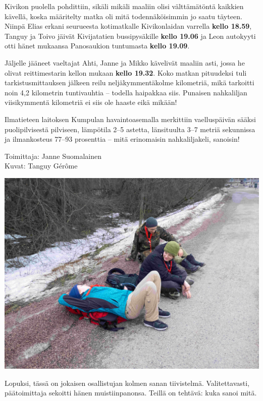 \begin{multicols}{2}
	Kivikon puolella pohdittiin, sikäli mikäli maaliin olisi välttämätöntä
	kaikkien kävellä, koska määritelty matka oli mitä todennäköisimmin jo
	saatu täyteen. Niinpä Elias erkani seurueesta kotimatkalle
	Kivikonlaidan varrella \textbf{kello 18.59}, Tanguy ja Toivo jäivät
	Kivijatatien bussipysäkille \textbf{kello 19.06} ja Leon autokyyti otti
	hänet mukaansa Panosaukion tuntumasta \textbf{kello 19.09}.

	Jäljelle jääneet vaeltajat Ahti, Janne ja Mikko kävelivät maaliin asti,
	jossa he olivat reittimestarin kellon mukaan \textbf{kello 19.32}. Koko
	matkan pituudeksi tuli tarkistusmittauksen jälkeen reilu
	neljäkymmentäkolme kilometriä, mikä tarkoitti noin 4,2 kilometrin
	tuntivauhtia – todella haipakkaa siis. Punaisen nahkaliljan
	viisikymmentä kilometriä ei siis ole haaste eikä mikään!

	Ilmatieteen laitoksen Kumpulan havaintoasemalla merkittiin
	vaelluspäivän sääksi puolipilvisestä pilviseen, lämpötila 2–5 astetta,
	länsituulta 3–7 metriä sekunnissa ja ilmankosteus 77–93 prosenttia –
	mitä erinomaisin nahkaliljakeli, sanoisin!\\

	\vspace*{0.50cm}

	\raggedleft Toimittaja: Janne Suomalainen\\
	\vspace*{0.10cm}
	\raggedleft Kuvat: Tanguy Gérôme

\end{multicols}

\begin{center}
\includegraphics[width=0.65\linewidth]{assets/nahkaliljaviikki}
\end{center}

Lopuksi, tässä on jokaisen osallistujan kolmen sanan tiivistelmä.
Valitettavasti, päätoimittaja sekoitti hänen muistiinpanonsa.
Teillä on tehtävä: kuka sanoi mitä.

